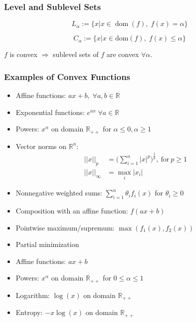 \subsubsection{Level and Sublevel Sets}
\begin{equation*}
    L_{\alpha} := \{ x | x \in \operatorname{dom}(f),\; f(x) = \alpha \}
\end{equation*}
\newpar{}

\begin{equation*}
    C_{\alpha} := \{x | x \in \text{dom}(f),\; f(x) \leq \alpha\}
\end{equation*}

\newpar{}
$f$ is convex $\Rightarrow$ sublevel sets of $f$ are convex $\forall \alpha$.

\subsubsection{Examples of Convex Functions}
\begin{itemize}
    \item Affine functions: $ ax + b,\; \forall a,b\in \mathbb{R}$
    \item Exponential functions: $e^{ax}\; \forall a\in \mathbb{R}$
    \item Powers: $x^\alpha$ on domain $\mathbb{R}_{++}$ for $\alpha \leq 0, \alpha \geq1$
    \item Vector norms on $\mathbb{R}^n$:
          \begin{align*}
              ||x||_p      & ={\biggl(\sum_{i=1}^n|x|^p\biggr)}^{\frac{1}{p}},\mathrm{~for~}p\geq1 \\
              ||x||_\infty & =\max_i|x_i|
          \end{align*}
\end{itemize}
\newpar{}
\begin{itemize}
    \item Nonnegative weighted sums: $\sum_{i=1}^{n} \theta_i f_i(x)$ for $\theta_i \geq 0$
    \item Composition with an affine function: $f(ax+b)$
    \item Pointwise maximum/supremum: $\max(f_1(x),f_2(x))$
    \item Partial minimization
\end{itemize}

\newpar{}

\begin{itemize}
    \item Affine functions: $ ax + b$
    \item Powers: $x^\alpha$ on domain $\mathbb{R}_{++}$ for $0\leq\alpha \leq 1$
    \item Logarithm: $\log(x)$ on domain $\mathbb{R}_{++}$
    \item Entropy: $-x\log(x)$ on domain $\mathbb{R}_{++}$
\end{itemize}

